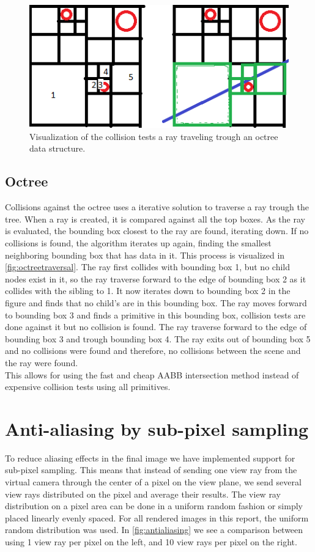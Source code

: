 \documentclass[a4paper, 12pt]{report}
\begin{document}
\begin{figure}
	\centering
	\includegraphics[width=\textwidth]{figures/octreetwod.png}
	\caption{Visualization of the collision tests a ray traveling trough an octree data structure.}
	\label{fig:octreetraversal}
\end{figure}

\subsection{Octree}
Collisions against the octree uses a iterative solution to traverse a ray trough the tree.
When a ray is created, it is compared against all the top boxes.
As the ray is evaluated, the bounding box closest to the ray are found, iterating down.
If no collisions is found, the algorithm iterates up again, finding the smallest neighboring bounding box that has data in it. This process is visualized in \autoref{fig:octreetraversal}. 
The ray first collides with bounding box 1, but no child nodes exist in it, so the ray traverse forward to the edge of bounding box 2 as it collides with the sibling to 1. 
It now iterates down to bounding box 2 in the figure and finds that no child's are in this bounding box. 
The ray moves forward to bounding box 3 and finds a primitive in this bounding box, collision tests are done against it but no collision is found.
The ray traverse forward to the edge of bounding box 3 and trough bounding box 4.
The ray exits out of bounding box 5 and no collisions were found and therefore, no collisions between the scene and the ray were found.\\

This allows for using the fast and cheap AABB intersection method instead of expensive collision tests using all primitives.

\section{Anti-aliasing by sub-pixel sampling}
To reduce aliasing effects in the final image we have implemented support for sub-pixel sampling.
This means that instead of sending one view ray from the virtual camera through the center of a pixel on the view plane, we send several view rays distributed on the pixel and average their results.
The view ray distribution on a pixel area can be done in a uniform random fashion or simply placed linearly evenly spaced.
For all rendered images in this report, the uniform random distribution was used.
In  \autoref{fig:antialiasing} we see a comparison between using 1 view ray per pixel on the left, and 10 view rays per pixel on the right.
\end{document}
